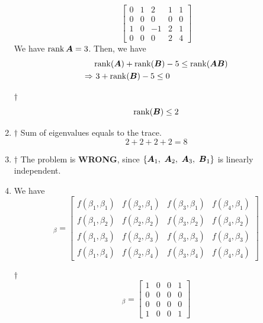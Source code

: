 \documentclass[a4paper,12pt]{article}
\begin{document}
\begin{enumerate}
\begin{equation}
\begin{bmatrix}
			0 & 1 & 2 & 1 & 1 \\
			0 & 0 & 0 & 0 & 0 \\
			1 & 0 & -1 & 2 & 1 \\
			0 & 0 & 0 & 2 & 4
		\end{bmatrix}
	\end{equation} We have $\operatorname{rank}{\boldsymbol{A}} = 3$. Then, we have \begin{equation}
		\begin{aligned}
			& \operatorname{rank}(\boldsymbol{A}) + \operatorname{rank}(\boldsymbol{B}) - 5 \le \operatorname{rank}(\boldsymbol{AB}) \\
			\Rightarrow & \ 3 + \operatorname{rank}(\boldsymbol{B}) - 5 \le 0 \\
		\end{aligned}
	\end{equation}
	\begin{answer}{$\dag$}\begin{equation}
			\operatorname{rank}(\boldsymbol{B}) \le 2
		\end{equation}
	\end{answer}
	\item \begin{answer}{$\dag$} Sum of eigenvalues equals to the trace. \begin{equation}
			2 + 2 + 2 + 2 = 8
		\end{equation}
	\end{answer}
	\item \begin{answer}{$\dag$} The problem is \textbf{WRONG}, since $\{\mat{A}_1, \ \mat{A}_2, \ \mat{A}_3, \ \mat{B}_1\}$ is linearly independent.
	\end{answer}
	\item We have \begin{equation}
		[f]_{\beta} = \begin{bmatrix}
			f(\beta_1, \beta_1) & f(\beta_2, \beta_1) & f(\beta_3, \beta_1) & f(\beta_4, \beta_1) \\
			f(\beta_1, \beta_2) & f(\beta_2, \beta_2) & f(\beta_3, \beta_2) & f(\beta_4, \beta_2) \\
			f(\beta_1, \beta_3) & f(\beta_2, \beta_3) & f(\beta_3, \beta_3) & f(\beta_4, \beta_3) \\
			f(\beta_1, \beta_4) & f(\beta_2, \beta_4) & f(\beta_3, \beta_4) & f(\beta_4, \beta_4)
		\end{bmatrix}
	\end{equation}
	\begin{answer}{$\dag$}\begin{equation}
			[f]_{\beta} = \begin{bmatrix}
				1 & 0 & 0 & 1 \\
				0 & 0 & 0 & 0 \\
				0 & 0 & 0 & 0 \\
				1 & 0 & 0 & 1
			\end{bmatrix}
		\end{equation}
	\end{answer}
\end{enumerate}

\end{document}
